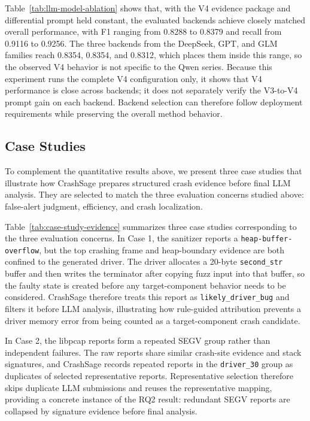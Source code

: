 \documentclass[pdflatex,sn-basic]{sn-jnl}%
\theoremstyle{thmstyleone}%
\theoremstyle{thmstyletwo}%
\theoremstyle{thmstylethree}%
\begin{document}
Table~\ref{tab:llm-model-ablation} shows that, with the V4 evidence package and differential prompt held constant, {\color{blue}the evaluated backends achieve closely matched overall performance, with F1 ranging from 0.8288 to 0.8379 and recall from 0.9116 to 0.9256. The three backends from the DeepSeek, GPT, and GLM families reach 0.8354, 0.8354, and 0.8312, which places them inside this range, so the observed V4 behavior is not specific to the Qwen series. Because this experiment runs the complete V4 configuration only, it shows that V4 performance is close across backends; it does not separately verify the V3-to-V4 prompt gain on each backend. Backend selection can therefore follow deployment requirements while preserving the overall method behavior.}

\FloatBarrier

\subsection{Case Studies}
\label{subsec:case-studies}

To complement the quantitative results above, we present three case studies that illustrate how CrashSage prepares structured crash evidence before final LLM analysis. They are selected to match the three evaluation concerns studied above: false-alert judgment, efficiency, and crash localization.

Table~\ref{tab:case-study-evidence} summarizes three case studies corresponding to the three evaluation concerns. In Case 1, the sanitizer reports a \texttt{heap-buffer-overflow}, but the top crashing frame and heap-boundary evidence are both confined to the generated driver.
The driver allocates a 20-byte \texttt{second\_str} buffer and then writes the terminator after copying fuzz input into that buffer, so the faulty state is created before any target-component behavior needs to be considered.
CrashSage therefore treats this report as \texttt{likely\_driver\_bug} and filters it before LLM analysis, illustrating how rule-guided attribution prevents a driver memory error from being counted as a target-component crash candidate.

In Case 2, the libpcap reports form a repeated SEGV group rather than independent failures. The raw reports share similar crash-site evidence and stack signatures, and CrashSage records repeated reports in the \texttt{driver\_30} group as duplicates of selected representative reports.
Representative selection therefore skips duplicate LLM submissions and reuses the representative mapping, providing a concrete instance of the RQ2 result: redundant SEGV reports are collapsed by signature evidence before final analysis.
\end{document}
